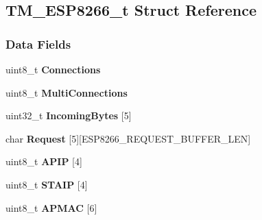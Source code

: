 \hypertarget{struct_t_m___e_s_p8266__t}{}\subsection{T\+M\+\_\+\+E\+S\+P8266\+\_\+t Struct Reference}
\label{struct_t_m___e_s_p8266__t}
\subsubsection*{Data Fields}
\begin{DoxyCompactItemize}
\item 
\hypertarget{struct_t_m___e_s_p8266__t_a7d354b4241c60b497f82c319c8bae227}{}uint8\+\_\+t {\bfseries Connections}\label{struct_t_m___e_s_p8266__t_a7d354b4241c60b497f82c319c8bae227}

\item 
\hypertarget{struct_t_m___e_s_p8266__t_a7852f06f738b8455ea6916a7968a2919}{}uint8\+\_\+t {\bfseries Multi\+Connections}\label{struct_t_m___e_s_p8266__t_a7852f06f738b8455ea6916a7968a2919}

\item 
\hypertarget{struct_t_m___e_s_p8266__t_aa417dde8c102924ed368cedebd4823d5}{}uint32\+\_\+t {\bfseries Incoming\+Bytes} \mbox{[}5\mbox{]}\label{struct_t_m___e_s_p8266__t_aa417dde8c102924ed368cedebd4823d5}

\item 
\hypertarget{struct_t_m___e_s_p8266__t_acf727c74d79c711141d382dfe48df661}{}char {\bfseries Request} \mbox{[}5\mbox{]}\mbox{[}E\+S\+P8266\+\_\+\+R\+E\+Q\+U\+E\+S\+T\+\_\+\+B\+U\+F\+F\+E\+R\+\_\+\+L\+E\+N\mbox{]}\label{struct_t_m___e_s_p8266__t_acf727c74d79c711141d382dfe48df661}

\item 
\hypertarget{struct_t_m___e_s_p8266__t_a67545360053d8c10ef95fdfae8c422ad}{}uint8\+\_\+t {\bfseries A\+P\+I\+P} \mbox{[}4\mbox{]}\label{struct_t_m___e_s_p8266__t_a67545360053d8c10ef95fdfae8c422ad}

\item 
\hypertarget{struct_t_m___e_s_p8266__t_a82b3a84ea209cd83e4937105b6a63c15}{}uint8\+\_\+t {\bfseries S\+T\+A\+I\+P} \mbox{[}4\mbox{]}\label{struct_t_m___e_s_p8266__t_a82b3a84ea209cd83e4937105b6a63c15}

\item 
\hypertarget{struct_t_m___e_s_p8266__t_a87fdeeca0c21efcf17af3ebed8bbbb9a}{}uint8\+\_\+t {\bfseries A\+P\+M\+A\+C} \mbox{[}6\mbox{]}\label{struct_t_m___e_s_p8266__t_a87fdeeca0c21efcf17af3ebed8bbbb9a}


\end{DoxyCompactItemize}
